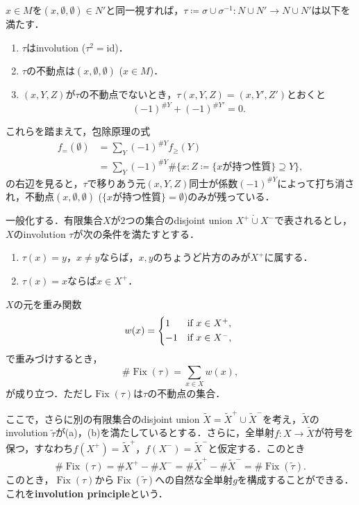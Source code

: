 \documentclass[xelatex,ja=standard,a4paper,14pt,everyparhook=compat]{bxjsarticle}
\DeclareMathOperator{\Fix}{Fix}
\newcommand{\wt}[1]{\widetilde{#1}}
\newcommand{\dcup}{\mathbin{\dot\cup}}
\theoremstyle{definition}
\begin{document}
$x \in M$を$(x, \emptyset, \emptyset) \in N'$と同一視すれば，$\tau \coloneqq \sigma \cup \sigma^{-1} : N \cup N' \to N \cup N'$は以下を満たす． \begin{enumerate}
    \item $\tau$はinvolution ($\tau^2 = \mathrm{id}$)．
    \item $\tau$の不動点は$(x, \emptyset, \emptyset)$ ($x \in M$)．
    \item $(x,Y,Z)$が$\tau$の不動点でないとき，$\tau(x,Y,Z) = (x,Y',Z')$とおくと \begin{equation*}
              (-1)^{\#Y} + (-1)^{\#Y'} = 0.
          \end{equation*}
\end{enumerate}
これらを踏まえて，包除原理の式 \begin{align*}
    f_=(\emptyset) & = \sum_Y (-1)^{\#Y} f_\geq(Y)                                                   \\
                   & = \sum_Y (-1)^{\#Y} \#\{x : Z \coloneqq \{\text{$x$が持つ性質}\} \supseteq Y\},
\end{align*}
の右辺を見ると，$\tau$で移りあう元$(x,Y,Z)$同士が係数$(-1)^{\#Y}$によって打ち消され，不動点$(x,\emptyset,\emptyset)$ ($\{\text{$x$が持つ性質}\} = \emptyset$)のみが残っている．

一般化する．有限集合$X$が$2$つの集合のdisjoint union $X^+ \dcup X^-$で表されるとし，$X$のinvolution $\tau$が次の条件を満たすとする． \begin{enumerate}
    \item $\tau(x) = y$，$x \neq y$ならば，$x,y$のちょうど片方のみが$X^+$に属する．
    \item $\tau(x) = x$ならば$x \in X^+$．
\end{enumerate}
$X$の元を重み関数 \begin{equation*}
    w(x) = \begin{cases*}
        1  & if $x \in X^+$, \\
        -1 & if $x \in X^-$,
    \end{cases*}
\end{equation*}
で重みづけするとき， \begin{equation*}
    \#\Fix(\tau) = \sum_{x \in X} w(x),
\end{equation*}
が成り立つ．ただし$\Fix(\tau)$は$\tau$の不動点の集合．

ここで，さらに別の有限集合のdisjoint union $\wt X = \wt X^+ \cup \wt X^-$を考え，$\wt X$のinvolution $\wt \tau$が(a)，(b)を満たしているとする．さらに，全単射$f : X \to \wt X$が符号を保つ，すなわち$f(X^+) = \wt X^+$，$f(X^-) = \wt X^-$と仮定する．このとき \begin{equation*}
    \#\Fix(\tau) = \#X^+ - \#X^- = \# \wt X^+ - \# \wt X^- = \#\Fix(\wt \tau).
\end{equation*}
このとき，$\Fix(\tau)$から$\Fix(\wt \tau)$への自然な全単射$g$を構成することができる．これを\textbf{involution principle}という．
\end{document}
